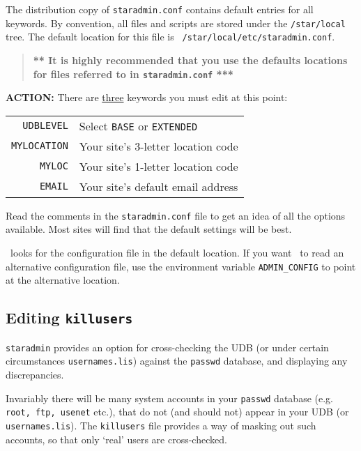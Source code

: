 The distribution copy of {\tt staradmin.conf} contains default entries for
all keywords. By convention, all files and scripts are stored under the
{\tt /star/local} tree. The default location for this file is {\tt
/star/local/etc/staradmin.conf}. 

\begin{quote}
  {\bf *** It is highly recommended that you use the defaults locations for 
           files referred to in {\tt staradmin.conf} *** }
\end{quote}

{\large\bf ACTION:} There are \underline{three} keywords you must edit at 
this point:

\begin{table}[ht]
\centering
\begin{tabular}{rl}
{\tt UDBLEVEL}   & Select {\tt BASE} or {\tt EXTENDED} \\
{\tt MYLOCATION} & Your site's 3-letter location code \\
{\tt MYLOC}      & Your site's 1-letter location code \\
{\tt EMAIL}      & Your site's default email address \\
\end{tabular}
\end{table}

Read the comments in the {\tt staradmin.conf} file to get an idea of all
the options available. Most sites will find that the default settings will
be best. 

\staradmin\ looks for the configuration file in the default
location. If you want \staradmin\ to read an alternative configuration file,
use the environment variable {\tt ADMIN\_CONFIG} to point at the alternative
location.

\subsection{Editing {\tt killusers}}
\label{killusers}

{\tt staradmin} provides an option for cross-checking the UDB (or under certain
circumstances {\tt usernames.lis}) against the {\tt passwd} database, and
displaying any discrepancies. 

Invariably there will be many system accounts in your {\tt passwd} database
(e.g. {\tt root, ftp, usenet} etc.), that do not (and should not) appear in
your UDB (or {\tt usernames.lis}).  The {\tt killusers} file provides a way of
masking out such accounts, so that only `real' users are cross-checked.

